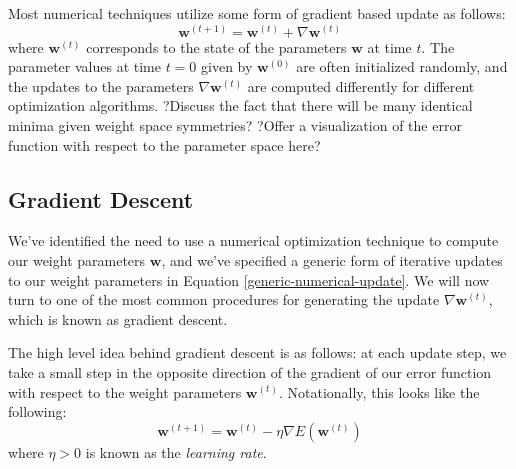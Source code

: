 
Most numerical techniques utilize some form of gradient based update as follows:
\begin{equation} \label{generic-numerical-update}
	\textbf{w}^{(t+1)} = \textbf{w}^{(t)} + \nabla \textbf{w}^{(t)}
\end{equation}
where $\textbf{w}^{(t)}$ corresponds to the state of the parameters $\textbf{w}$ at time $t$. The parameter values at time $t=0$ given by $\textbf{w}^{(0)}$ are often initialized randomly, and the updates to the parameters $\nabla\textbf{w}^{(t)}$ are computed differently for different optimization algorithms. \newline
?Discuss the fact that there will be many identical minima given weight space symmetries? \newline
?Offer a visualization of the error function with respect to the parameter space here?

\subsection{Gradient Descent}
We've identified the need to use a numerical optimization technique to compute our weight parameters $\textbf{w}$, and we've specified a generic form of iterative updates to our weight parameters in Equation \ref{generic-numerical-update}. We will now turn to one of the most common procedures for generating the update $\nabla\textbf{w}^{(t)}$, which is known as gradient descent.

The high level idea behind gradient descent is as follows: at each update step, we take a small step in the opposite direction of the gradient of our error function with respect to the weight parameters $\textbf{w}^{(t)}$. Notationally, this looks like the following:
\begin{equation} \label{gradient-descent-equation}
	\textbf{w}^{(t+1)} = \textbf{w}^{(t)} - \eta \nabla E(\textbf{w}^{(t)})
\end{equation}
where $\eta > 0$ is known as the \textit{learning rate}.

